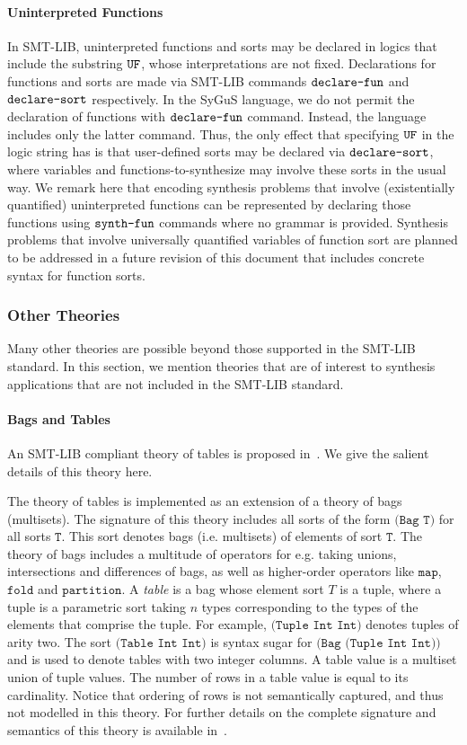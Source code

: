 \documentclass[english,a4paper,10pt]{article}
\begin{document}
\paragraph{Uninterpreted Functions}
In SMT-LIB, uninterpreted functions and sorts may be declared in
logics that include the substring ${\tt UF}$,
whose interpretations are not fixed.
Declarations for functions and sorts are made via SMT-LIB commands 
$\texttt{declare-fun}$ and $\texttt{declare-sort}$ respectively.
In the SyGuS language, we do not permit
the declaration of functions with $\texttt{declare-fun}$ command.
Instead, the language includes only the latter command.
Thus, the only effect that specifying ${\tt UF}$ in the logic string has is
that user-defined sorts may be declared via $\texttt{declare-sort}$, where
variables and functions-to-synthesize may involve these sorts in the usual way.
We remark here that
encoding synthesis problems 
that involve (existentially quantified)
uninterpreted functions
can be represented by declaring those functions
using $\texttt{synth-fun}$ commands where no grammar is provided.
Synthesis problems that involve universally quantified variables of function sort
are planned to be addressed in a future revision of this document
that includes concrete syntax for function sorts.

\subsubsection{Other Theories}

Many other theories
are possible beyond those supported in the SMT-LIB standard.
In this section, we mention theories that are of interest to synthesis applications
that are not included in the SMT-LIB standard.

\paragraph{Bags and Tables}
An SMT-LIB compliant theory of tables is proposed in~\cite{theoryOfTables}.
We give the salient details of this theory here.

The theory of tables is implemented as an extension of a theory of bags (multisets).
The signature of this theory includes all sorts of the form
$\texttt{(Bag\ T)}$
for all sorts $\texttt{T}$. 
This sort denotes bags (i.e. multisets) of elements of sort $\texttt{T}$.
The theory of bags includes a multitude of operators for e.g.
taking unions, intersections and differences of bags,
as well as higher-order operators like 
$\texttt{map}$, $\texttt{fold}$ and $\texttt{partition}$.
A \emph{table} is a bag whose element sort $T$ is a tuple,
where a tuple is a parametric sort taking $n$ types corresponding to the
types of the elements that comprise the tuple.
For example, $\texttt{(Tuple\ Int\ Int)}$ denotes tuples
of arity two.
The sort $\texttt{(Table\ Int\ Int)}$ is syntax sugar for
$\texttt{(Bag\ (Tuple\ Int\ Int))}$ and is used to denote tables with two integer
columns.
A table value is a multiset union of tuple values.
The number of rows in a table value is equal to its cardinality.
Notice that ordering of rows is not semantically captured,
and thus not modelled in this theory.
For further details on the complete signature and semantics of this
theory is available in~\cite{theoryOfTables}.
\end{document}
